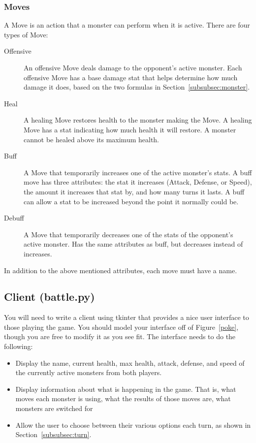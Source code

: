 \documentclass[11pt]{cselabheader}
\begin{document}
\subsubsection{Moves}
\label{subsubsec:moves}
A Move is an action that a monster can perform when it is active. There are four
types of Move:

\begin{description}
\item[Offensive] An offensive Move deals damage to the opponent's active monster.
  Each offensive Move has a base damage stat that helps determine how much damage it
  does, based on the two formulas in Section~\ref{subsubsec:monster}.
\item[Heal] A healing Move restores health to the monster making the Move. A healing
  Move has a stat indicating how much health it will restore. A monster cannot be
  healed above its maximum health.
\item[Buff] A Move that temporarily increases one of the active monster's stats. A buff move
  has three attributes: the stat it increases (Attack, Defense, or Speed), the
  amount it increases that stat by, and how many turns it lasts. A buff can allow a stat
  to be increased beyond the point it normally could be.
\item[Debuff] A Move that temporarily decreases one of the stats of the opponent's active
  monster. Has the same attributes as buff, but decreases instead of increases.
\end{description}

In addition to the above mentioned attributes, each move must have a name.

\subsection{Client (battle.py)}
You will need to write a client using tkinter that provides a nice user interface
to those playing the game. You should model your interface off of
Figure~\ref{poke}, though you are free to modify it as you see fit. The interface
needs to do the following:
\begin{itemize}
\item Display the name, current health, max health, attack, defense, and speed of the
  currently active monsters from both players.
\item Display information about what is happening in the game. That is, what moves each
  monster is using, what the results of those moves are, what monsters are switched for
\item Allow the user to choose between their various options each turn, as shown in
  Section~\ref{subsubsec:turn}.
\end{itemize}
\end{document}
